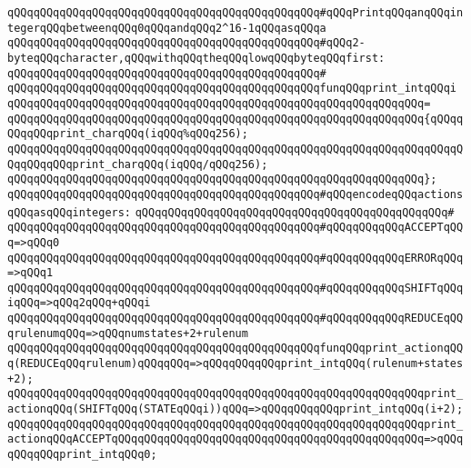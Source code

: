 \verb|qQQqqQQqqQQqqQQqqQQqqQQqqQQqqQQqqQQqqQQqqQQqqQQq#qQQqPrintqQQqanqQQqintegerqQQqbetweenqQQq0qQQqandqQQq2^16-1qQQqasqQQqa|\newline
\verb|qQQqqQQqqQQqqQQqqQQqqQQqqQQqqQQqqQQqqQQqqQQqqQQq#qQQq2-byteqQQqcharacter,qQQqwithqQQqtheqQQqlowqQQqbyteqQQqfirst:|\newline
\verb|qQQqqQQqqQQqqQQqqQQqqQQqqQQqqQQqqQQqqQQqqQQqqQQq#|\newline
\verb|qQQqqQQqqQQqqQQqqQQqqQQqqQQqqQQqqQQqqQQqqQQqqQQqfunqQQqprint_intqQQqi|\newline
\verb|qQQqqQQqqQQqqQQqqQQqqQQqqQQqqQQqqQQqqQQqqQQqqQQqqQQqqQQqqQQqqQQq=|\newline
\verb|qQQqqQQqqQQqqQQqqQQqqQQqqQQqqQQqqQQqqQQqqQQqqQQqqQQqqQQqqQQqqQQq{qQQqqQQqqQQqprint_charqQQq(iqQQq%qQQq256);|\newline
\verb|qQQqqQQqqQQqqQQqqQQqqQQqqQQqqQQqqQQqqQQqqQQqqQQqqQQqqQQqqQQqqQQqqQQqqQQqqQQqqQQqprint_charqQQq(iqQQq/qQQq256);|\newline
\verb|qQQqqQQqqQQqqQQqqQQqqQQqqQQqqQQqqQQqqQQqqQQqqQQqqQQqqQQqqQQqqQQq};|\newline
\newline
\verb|qQQqqQQqqQQqqQQqqQQqqQQqqQQqqQQqqQQqqQQqqQQqqQQq#qQQqencodeqQQqactionsqQQqasqQQqintegers:|\newline
\verb|qQQqqQQqqQQqqQQqqQQqqQQqqQQqqQQqqQQqqQQqqQQqqQQq#|\newline
\verb|qQQqqQQqqQQqqQQqqQQqqQQqqQQqqQQqqQQqqQQqqQQqqQQq#qQQqqQQqqQQqACCEPTqQQq=>qQQq0|\newline
\verb|qQQqqQQqqQQqqQQqqQQqqQQqqQQqqQQqqQQqqQQqqQQqqQQq#qQQqqQQqqQQqERRORqQQq=>qQQq1|\newline
\verb|qQQqqQQqqQQqqQQqqQQqqQQqqQQqqQQqqQQqqQQqqQQqqQQq#qQQqqQQqqQQqSHIFTqQQqiqQQq=>qQQq2qQQq+qQQqi|\newline
\verb|qQQqqQQqqQQqqQQqqQQqqQQqqQQqqQQqqQQqqQQqqQQqqQQq#qQQqqQQqqQQqREDUCEqQQqrulenumqQQq=>qQQqnumstates+2+rulenum|\newline
\newline
\newline
\verb|qQQqqQQqqQQqqQQqqQQqqQQqqQQqqQQqqQQqqQQqqQQqqQQqfunqQQqprint_actionqQQq(REDUCEqQQqrulenum)qQQqqQQq=>qQQqqQQqqQQqprint_intqQQq(rulenum+states+2);|\newline
\verb|qQQqqQQqqQQqqQQqqQQqqQQqqQQqqQQqqQQqqQQqqQQqqQQqqQQqqQQqqQQqqQQqprint_actionqQQq(SHIFTqQQq(STATEqQQqi))qQQq=>qQQqqQQqqQQqprint_intqQQq(i+2);|\newline
\verb|qQQqqQQqqQQqqQQqqQQqqQQqqQQqqQQqqQQqqQQqqQQqqQQqqQQqqQQqqQQqqQQqprint_actionqQQqACCEPTqQQqqQQqqQQqqQQqqQQqqQQqqQQqqQQqqQQqqQQqqQQqqQQq=>qQQqqQQqqQQqprint_intqQQq0;|\newline
